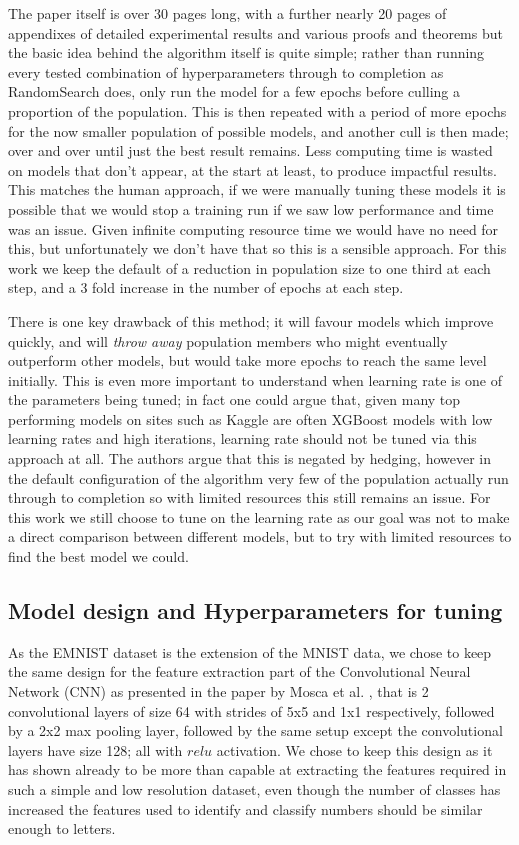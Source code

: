 \documentclass[12pt]{article}
\numberwithin{equation}{section}
\numberwithin{figure}{section}
\numberwithin{table}{section}
\begin{document}
The paper itself is over 30 pages long, with a further nearly 20 pages of appendixes of detailed experimental results and various proofs and theorems but the basic idea behind the algorithm itself is quite simple; rather than running every tested combination of hyperparameters through to completion as RandomSearch does, only run the model for a few epochs before culling a proportion of the population. This is then repeated with a period of more epochs for the now smaller population of possible models, and another cull is then made; over and over until just the best result remains. Less computing time is wasted on models that don't appear, at the start at least, to produce impactful results. This matches the human approach, if we were manually tuning these models it is possible that we would stop a training run if we saw low performance and time was an issue. Given infinite computing resource time we would have no need for this, but unfortunately we don't have that so this is a sensible approach. For this work we keep the default of a reduction in population size to one third at each step, and a 3 fold increase in the number of epochs at each step.

There is one key drawback of this method; it will favour models which improve quickly, and will \emph{throw away} population members who might eventually outperform other models, but would take more epochs to reach the same level initially. This is even more important to understand when learning rate is one of the parameters being tuned; in fact one could argue that, given many top performing models on sites such as Kaggle are often XGBoost models with low learning rates and high iterations, learning rate should not be tuned via this approach at all. The authors argue that this is negated by hedging, however in the default configuration of the algorithm very few of the population actually run through to completion so with limited resources this still remains an issue. For this work we still choose to tune on the learning rate as our goal was not to make a direct comparison between different models, but to try with limited resources to find the best model we could.

\subsection{Model design and Hyperparameters for tuning}
As the EMNIST dataset is the extension of the MNIST data, we chose to keep the same design for the feature extraction part of the Convolutional Neural Network (CNN) as presented in the paper by Mosca et al. \cite{Mosca2017}, that is 2 convolutional layers of size 64 with strides of 5x5 and 1x1 respectively, followed by a 2x2 max pooling layer, followed by the same setup except the convolutional layers have size 128; all with $relu$ activation. We chose to keep this design as it has shown already to be more than capable at extracting the features required in such a simple and low resolution dataset, even though the number of classes has increased the features used to identify and classify numbers should be similar enough to letters. 
\end{document}
